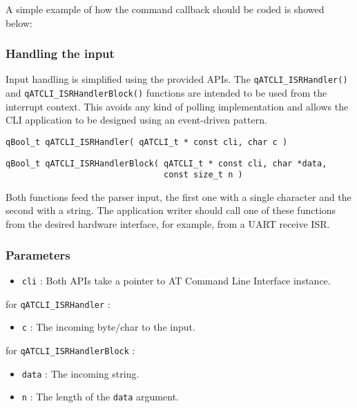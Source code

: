 A simple example of how the command callback should be coded is showed below:
\medskip




\subsubsection{Handling the input}
Input handling is simplified using the provided APIs. The \lstinline{qATCLI_ISRHandler()}  and \lstinline{qATCLI_ISRHandlerBlock()}   functions are intended to be used from the interrupt context. This avoids any kind of polling implementation and allows the CLI application to be designed using an event-driven pattern.
\medskip
\begin{lstlisting}[style=CStyle]
qBool_t qATCLI_ISRHandler( qATCLI_t * const cli, char c )
\end{lstlisting}

\begin{lstlisting}[style=CStyle]
qBool_t qATCLI_ISRHandlerBlock( qATCLI_t * const cli, char *data, 
                                const size_t n )
\end{lstlisting}

Both functions feed the parser input, the first one with a single character and the second with a string. The application writer should call one of these functions from the desired hardware interface, for example, from a UART receive ISR. 

\subsubsection*{Parameters}
\begin{itemize}
    \item \lstinline{cli} : Both APIs take a pointer to AT Command Line Interface instance.
\end{itemize}

for \lstinline{qATCLI_ISRHandler} :
\begin{itemize}
    \item \lstinline{c} : The incoming byte/char to the input. 
\end{itemize}

for \lstinline{qATCLI_ISRHandlerBlock} :
\begin{itemize}
    \item \lstinline{data} : The incoming string.
    \item \lstinline{n} : The length of the \lstinline{data} argument.
\end{itemize}

